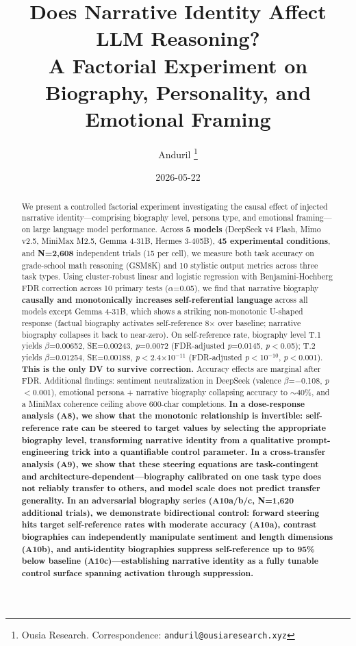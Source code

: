 \documentclass[11pt,a4paper]{article}
\title{Does Narrative Identity Affect LLM Reasoning?\\
\large A Factorial Experiment on Biography, Personality, and Emotional Framing}
\author{Anduril \thanks{Ousia Research. Correspondence: \texttt{anduril@ousiaresearch.xyz}}}
\date{2026-05-22}
\begin{document}
\maketitle

\begin{abstract}
We present a controlled factorial experiment investigating the causal effect of injected narrative identity---comprising biography level, persona type, and emotional framing---on large language model performance. Across \textbf{5 models} (DeepSeek v4 Flash, Mimo v2.5, MiniMax M2.5, Gemma 4-31B, Hermes 3-405B), \textbf{45 experimental conditions}, and \textbf{N=2,608} independent trials (15 per cell), we measure both task accuracy on grade-school math reasoning (GSM8K) and 10 stylistic output metrics across three task types. Using cluster-robust linear and logistic regression with Benjamini-Hochberg FDR correction across 10 primary tests ($\alpha$=0.05), we find that narrative biography \textbf{causally and monotonically increases self-referential language} across all models except Gemma 4-31B, which shows a striking non-monotonic U-shaped response (factual biography activates self-reference 8$\times$ over baseline; narrative biography collapses it back to near-zero). On self-reference rate, biography level T.1 yields $\beta$=0.00652, SE=0.00243, \textit{p}=0.0072 (FDR-adjusted \textit{p}=0.0145, \textit{p}$<$0.05); T.2 yields $\beta$=0.01254, SE=0.00188, \textit{p}$<$2.4$\times$10$^{-11}$ (FDR-adjusted \textit{p}$<$10$^{-10}$, \textit{p}$<$0.001). \textbf{This is the only DV to survive correction.} Accuracy effects are marginal after FDR. Additional findings: sentiment neutralization in DeepSeek (valence $\beta$=$-$0.108, \textit{p}$<$0.001), emotional persona + narrative biography collapsing accuracy to $\sim$40\%, and a MiniMax coherence ceiling above 600-char completions. \textbf{In a dose-response analysis (A8), we show that the monotonic relationship is invertible: self-reference rate can be steered to target values by selecting the appropriate biography level, transforming narrative identity from a qualitative prompt-engineering trick into a quantifiable control parameter. In a cross-transfer analysis (A9), we show that these steering equations are task-contingent and architecture-dependent---biography calibrated on one task type does not reliably transfer to others, and model scale does not predict transfer generality. In an adversarial biography series (A10a/b/c, N=1,620 additional trials), we demonstrate bidirectional control: forward steering hits target self-reference rates with moderate accuracy (A10a), contrast biographies can independently manipulate sentiment and length dimensions (A10b), and anti-identity biographies suppress self-reference up to 95\% below baseline (A10c)---establishing narrative identity as a fully tunable control surface spanning activation through suppression.}
\end{abstract}
\end{document}
